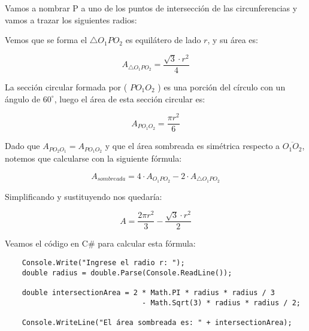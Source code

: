 Vamos a nombrar P a uno de los puntos de intersección de las circunferencias y vamos a trazar los siguientes radios:

\begin{center}
\end{center}

Vemos que se forma el $\triangle O_1PO_2$ es equilátero de lado $r$, y su área es:

\[ A_{\triangle O_1PO_2} = \frac{\sqrt{3} \cdot r^2}{4} \]

La sección circular formada por ( $PO_1O_2$ ) es una porción del círculo con un ángulo de $60^\circ$, luego el área de esta sección circular es:

\[ A_{PO_1O_2} = \frac{\pi r^2}{6} \]

Dado que \( A_{PO_2O_1} = A_{PO_1O_2} \) y que el área sombreada es simétrica respecto a \( \overline{O_1 O_2} \), notemos que calcularse con la siguiente fórmula:

\[ A_{sombreada} = 4 \cdot A_{O_1PO_2} - 2 \cdot A_{\triangle O_1PO_2}\]

Simplificando y sustituyendo nos quedaría:

\[ A = \frac{2\pi r^2}{3} - \frac{\sqrt{3} \cdot r^2}{2} \]

Veamos el código en C\# para calcular esta fórmula:

\begin{lstlisting}
    Console.Write("Ingrese el radio r: ");
    double radius = double.Parse(Console.ReadLine());
    
    double intersectionArea = 2 * Math.PI * radius * radius / 3 
                                - Math.Sqrt(3) * radius * radius / 2;
    
    Console.WriteLine("El área sombreada es: " + intersectionArea);
\end{lstlisting}

